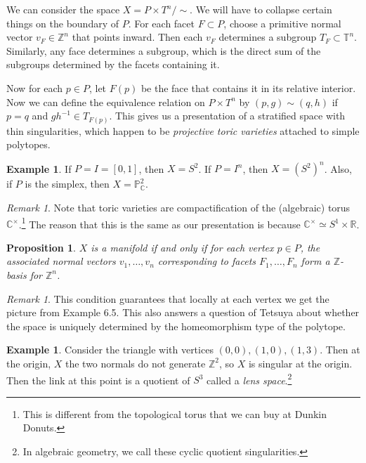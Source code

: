 \documentclass[leqno, openany]{memoir}
\newtheorem{prop}[thm]{Proposition}
\theoremstyle{definition}
\newtheorem{exm}[thm]{Example}
\theoremstyle{remark}
\newtheorem{rmk}[thm]{Remark}
\theoremstyle{plain}
\theoremstyle{definition}
\theoremstyle{remark}
\newcommand{\R}{\mathbb{R}}
\newcommand{\C}{\mathbb{C}}
\newcommand{\Z}{\mathbb{Z}}
\renewcommand{\P}{\mathbb{P}}
\newcommand{\T}{\mathbb{T}}
\begin{document}
We can consider the space $X = P \times T^n / \sim$. We will have to collapse certain things on the boundary of $P$. For each facet $F \subset P$, choose a primitive normal vector $v_F \in \Z^n$ that points inward. Then each $v_F$ determines a subgroup $T_F \subset \T^n$. Similarly, any face determines a subgroup, which is the direct sum of the subgroups determined by the facets containing it.

Now for each $p \in P$, let $F(p)$ be the face that contains it in its relative interior. Now we can define the equivalence relation on $P \times T^n$ by $(p,g) \sim (q,h)$ if $p = q$ and $gh^{-1} \in T_{F(p)}$. This gives us a presentation of a stratified space with thin singularities, which happen to be \textit{projective toric varieties} attached to simple polytopes.

\begin{exm}
    If $P = I = [0,1]$, then $X = S^2$. If $P = I^n$, then $X = (S^2)^n$. Also, if $P$ is the simplex, then $X = \P^2_{\C}$.
\end{exm}

\begin{rmk}
    Note that toric varieties are compactification of the (algebraic) torus $\C^{\times}$.\footnote{This is different from the topological torus that we can buy at Dunkin Donuts.} The reason that this is the same as our presentation is because $\C^{\times} \simeq S^1 \times \R$.
\end{rmk}

\begin{prop}
    $X$ is a manifold if and only if for each vertex $p \in P$, the associated normal vectors $v_1, \ldots, v_n$ corresponding to facets $F_1, \ldots, F_n$ form a $\Z$-basis for $\Z^n$.
\end{prop}

\begin{rmk}
    This condition guarantees that locally at each vertex we get the picture from Example 6.5. This also answers a question of Tetsuya about whether the space is uniquely determined by the homeomorphism type of the polytope.
\end{rmk}

\begin{exm}
    Consider the triangle with vertices $(0,0), (1,0), (1,3)$. Then at the origin, $X$ the two normals do not generate $\Z^2$, so $X$ is singular at the origin. Then the link at this point is a quotient of $S^3$ called a \textit{lens space}.\footnote{In algebraic geometry, we call these cyclic quotient singularities.}
\end{exm}
\end{document}
